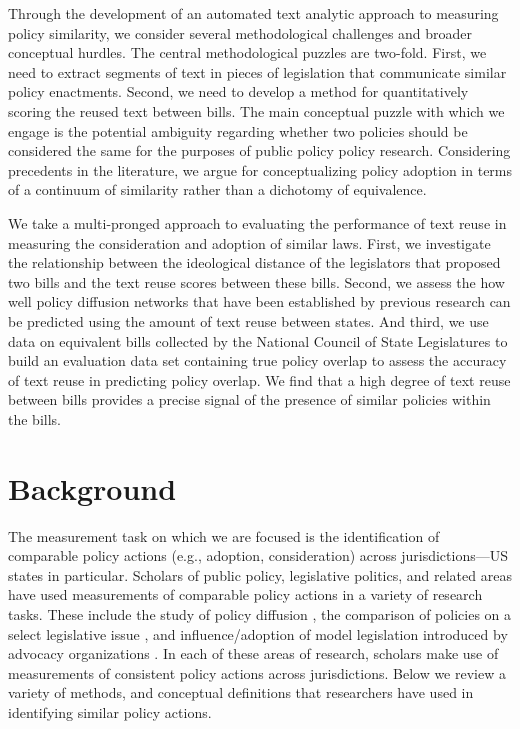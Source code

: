 \documentclass[12pt]{article} %
\begin{document}
Through the development of an automated text analytic approach to measuring policy similarity, we consider several methodological challenges and broader conceptual hurdles. The central methodological puzzles are two-fold. First, we need to extract segments of text in pieces of legislation that communicate similar policy enactments. Second, we need to develop a method for quantitatively scoring the reused text between bills. The main conceptual puzzle with which we engage is the potential ambiguity regarding whether two policies should be considered the same for the purposes of public policy policy research. Considering precedents in the literature, we argue for conceptualizing policy adoption in terms of a continuum of similarity rather than a dichotomy of equivalence.

We take a multi-pronged approach to evaluating the performance of text reuse in measuring the consideration and adoption of similar laws. First, we investigate the relationship between the ideological distance of the legislators that proposed two bills and the text reuse scores between these bills. Second, we assess the how well policy diffusion networks that have been established by previous research can be predicted using the amount of text reuse between states. And third, we use data on equivalent bills collected by the National Council of State Legislatures to build an evaluation data set containing true policy overlap to assess the accuracy of text reuse in predicting policy overlap. We find that a high degree of text reuse between bills provides a precise signal of the presence of similar policies within the bills. 


\section{Background}

The measurement task on which we are focused is the identification of comparable policy actions (e.g., adoption, consideration) across jurisdictions---US states in particular. Scholars of public policy, legislative politics, and related areas have used measurements of comparable policy actions in a variety of research tasks. These include the study of policy diffusion \citep{karch2007emerging}, the comparison of policies on a select legislative issue \citep[e.g., ][]{huber2001legislatures,mycoff2009empirical}, and influence/adoption of model legislation introduced by advocacy organizations \citep[e.g., ][]{garrett2015,burgess2016legislative}. In each of these areas of research, scholars make use of measurements of consistent policy actions across jurisdictions. Below we review a variety of methods, and conceptual definitions that researchers have used in identifying similar policy actions.
\end{document}
